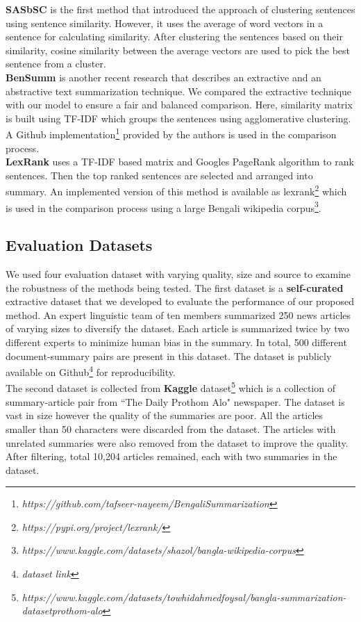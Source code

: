\documentclass[acmlarge]{acmart}
\begin{document}
\textbf{SASbSC} \cite{roychowdhury-etal-2022-spectral-base} is the first method that introduced the approach of clustering sentences using sentence similarity. However, it uses the average of word vectors in a sentence for calculating similarity. After clustering the sentences based on their similarity, cosine similarity between the average vectors are used to pick the best sentence from a cluster.\\

\textbf{BenSumm} \cite{chowdhury-etal-2021-tfidf-clustering} is another recent research that describes an extractive and an abstractive text summarization technique. We compared the extractive technique with our model to ensure a fair and balanced comparison. Here, similarity matrix is built using TF-IDF which groups the sentences using agglomerative clustering. A Github implementation\footnote{\textit{https://github.com/tafseer-nayeem/BengaliSummarization}} provided by the authors is used in the comparison process.\\

\textbf{LexRank} \cite{Erkan-lexRank-2004} uses a TF-IDF based matrix and Googles PageRank algorithm \cite{page-PageRank-1999} to rank sentences. Then the top ranked sentences are selected and arranged into summary. An implemented version of this method is available as lexrank\footnote{\textit{https://pypi.org/project/lexrank/}} which is used in the comparison process using a large Bengali wikipedia corpus\footnote{\textit{https://www.kaggle.com/datasets/shazol/bangla-wikipedia-corpus}}.

\subsection{Evaluation Datasets}\label{subsec:evaluation-datasets}
We used four evaluation dataset with varying quality, size and source to examine the robustness of the methods being tested. The first dataset is a \textbf{self-curated} extractive dataset that we developed to evaluate the performance of our proposed method. An expert linguistic team of ten members summarized 250 news articles of varying sizes to diversify the dataset. Each article is summarized twice by two different experts to minimize human bias in the summary. In total, 500 different document-summary pairs are present in this dataset. The dataset is publicly available on Github\footnote{\textit{dataset link}} for reproducibility.\\

The second dataset is collected from \textbf{Kaggle} dataset\footnote{\textit{https://www.kaggle.com/datasets/towhidahmedfoysal/bangla-summarization-datasetprothom-alo}} which is a collection of summary-article pair from ``The Daily Prothom Alo" newspaper. The dataset is vast in size however the quality of the summaries are poor. All the articles smaller than 50 characters were discarded from the dataset. The articles with unrelated summaries were also removed from the dataset to improve the quality. After filtering, total 10,204 articles remained, each with two summaries in the dataset.\\
\end{document}
